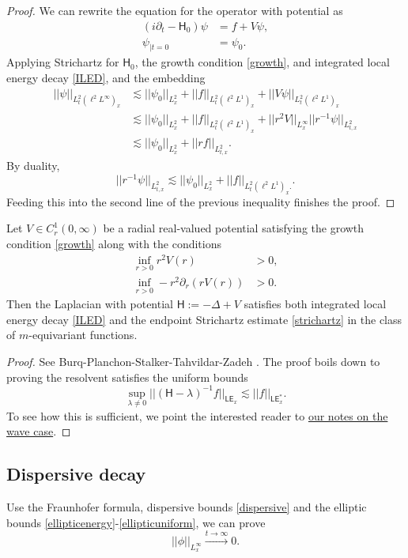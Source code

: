 \begin{proof}
    We can rewrite the equation for the operator with potential as 
        \begin{align*}
            (i \partial_t - \mathsf H_0)\psi
                &= f + V \psi,\\
            \psi_{|t = 0}
                &= \psi_0. 
        \end{align*} 
    Applying Strichartz for $\mathsf H_0$, the growth condition \eqref{growth}, and integrated local energy decay \eqref{ILED}, and the embedding 
        \begin{align*}
            ||\psi||_{L^2_t (\ell^2 L^\infty)_x}
                &\lesssim ||\psi_0||_{L^2_x} + ||f||_{L^2_t (\ell^2 L^1)_x} + ||V\psi||_{L^2_t (\ell^2 L^1)_x}\\
                &\lesssim ||\psi_0||_{L^2_x}  + ||f||_{L^2_t (\ell^2 L^1)_x} + \big|\big| r^2 V\big|\big|_{L^\infty_x} \big|\big| r^{-1}\psi\big|\big|_{L^2_{t, x}}\\
                &\lesssim  ||\psi_0||_{L^2_x}  + \big|\big| r f\big|\big|_{L^2_{t, x}} .
        \end{align*}
    By duality, 
        \[
            || r^{-1}\psi||_{L^2_{t, x}} 
                \lesssim ||\psi_0||_{L^2_x} +  ||f||_{L^2_t (\ell^2 L^1)_x.}.
        \]
    Feeding this into the second line of the previous inequality finishes the proof. 
\end{proof}

\begin{proposition}
    Let $V \in C^1_r (0, \infty)$ be a radial real-valued potential satisfying the growth condition \eqref{growth} along with the conditions
        \begin{align}
            \inf_{r > 0} r^2 V(r) 
                &> 0,\\
            \inf_{r > 0} - r^2 \partial_r (r V(r)) 
                &> 0.
        \end{align}
    Then the Laplacian with potential $\mathsf H := - \Delta + V$ satisfies both integrated local energy decay \eqref{ILED} and the endpoint Strichartz estimate \eqref{strichartz} in the class of $m$-equivariant functions. 
\end{proposition}

\begin{proof}
    See Burq-Planchon-Stalker-Tahvildar-Zadeh \cite{BurqEtAl2004}. The proof boils down to proving the resolvent satisfies the uniform bounds
        \begin{equation}
            \sup_{\lambda \neq 0}  
                ||(\mathsf H - \lambda)^{-1} f||_{\mathsf{LE}_{x}} 
                    \lesssim ||f||_{\mathsf{LE}^*_x}.
        \end{equation}
    To see how this is sufficient, we point the interested reader to \href{https://github.com/zhao-j4/notes/blob/main/seminar%20notes/local%20energy%20decay/main.pdf}{our notes on the wave case}. 
\end{proof}

\subsection{Dispersive decay}

Use the Fraunhofer formula, dispersive bounds \eqref{dispersive} and the elliptic bounds \eqref{ellipticenergy}-\eqref{ellipticuniform}, we can prove 
    \begin{equation}
        ||\phi||_{L^\infty_x} \overset{t \to \infty}{\longrightarrow} 0 . 
    \end{equation}
